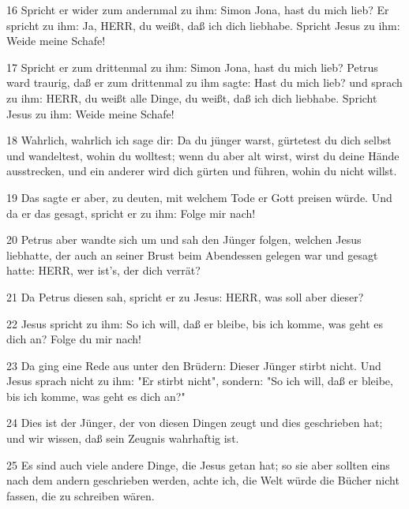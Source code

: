 \par 16 Spricht er wider zum andernmal zu ihm: Simon Jona, hast du mich lieb? Er spricht zu ihm: Ja, HERR, du weißt, daß ich dich liebhabe. Spricht Jesus zu ihm: Weide meine Schafe!
\par 17 Spricht er zum drittenmal zu ihm: Simon Jona, hast du mich lieb? Petrus ward traurig, daß er zum drittenmal zu ihm sagte: Hast du mich lieb? und sprach zu ihm: HERR, du weißt alle Dinge, du weißt, daß ich dich liebhabe. Spricht Jesus zu ihm: Weide meine Schafe!
\par 18 Wahrlich, wahrlich ich sage dir: Da du jünger warst, gürtetest du dich selbst und wandeltest, wohin du wolltest; wenn du aber alt wirst, wirst du deine Hände ausstrecken, und ein anderer wird dich gürten und führen, wohin du nicht willst.
\par 19 Das sagte er aber, zu deuten, mit welchem Tode er Gott preisen würde. Und da er das gesagt, spricht er zu ihm: Folge mir nach!
\par 20 Petrus aber wandte sich um und sah den Jünger folgen, welchen Jesus liebhatte, der auch an seiner Brust beim Abendessen gelegen war und gesagt hatte: HERR, wer ist's, der dich verrät?
\par 21 Da Petrus diesen sah, spricht er zu Jesus: HERR, was soll aber dieser?
\par 22 Jesus spricht zu ihm: So ich will, daß er bleibe, bis ich komme, was geht es dich an? Folge du mir nach!
\par 23 Da ging eine Rede aus unter den Brüdern: Dieser Jünger stirbt nicht. Und Jesus sprach nicht zu ihm: "Er stirbt nicht", sondern: "So ich will, daß er bleibe, bis ich komme, was geht es dich an?"
\par 24 Dies ist der Jünger, der von diesen Dingen zeugt und dies geschrieben hat; und wir wissen, daß sein Zeugnis wahrhaftig ist.
\par 25 Es sind auch viele andere Dinge, die Jesus getan hat; so sie aber sollten eins nach dem andern geschrieben werden, achte ich, die Welt würde die Bücher nicht fassen, die zu schreiben wären.

